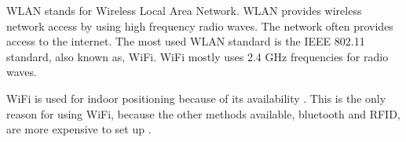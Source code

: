 WLAN stands for Wireless Local Area Network.
WLAN provides wireless network access by using high frequency radio waves.
The network often provides access to the internet.
The most used WLAN standard is the IEEE 802.11 standard\cite{ieee_wifi_standard}, also known as, WiFi.
WiFi mostly uses 2.4 GHz frequencies for radio waves\cite{ieee_wifi_standard}.


WiFi is used for indoor positioning because of its availability
\cite{indoor_maps_google_slides}\cite{improving_wifi_using_bluetooth}.
This is the only reason for using WiFi, because the other methods available, bluetooth and RFID, are more expensive to set up \cite{improving_wifi_using_bluetooth}.